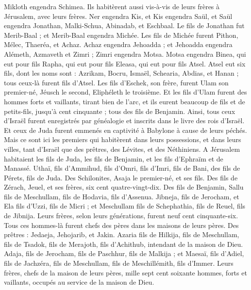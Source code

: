 \begin{multicols}{2}
Mikloth engendra Schimea. Ils habitèrent aussi vis-à-vis de leurs frères à Jérusalem, avec leurs frères.
Ner engendra Kis, et Kis engendra Saül, et Saül engendra Jonathan, Malki-Schua, Abinadab, et Eschbaal.
Le fils de Jonathan fut Merib-Baal ; et Merib-Baal engendra Michée.
Les fils de Michée furent Pithon, Mélec, Thaeréa, et Achaz.
Achaz engendra Jehoadda ; et Jehoadda engendra Alémeth, Azmaveth et Zimri ; Zimri engendra Motsa.
Motsa engendra Binea, qui eut pour fils Rapha, qui eut pour fils Eleasa, qui eut pour fils Atsel.
Atsel eut six fils, dont les noms sont : Azrikam, Bocru, Ismaël, Schearia, Abdias, et Hanan ; tous ceux-là furent fils d'Atsel.
Les fils d'Eschek, son frère, furent Ulam son premier-né, Jéusch le second, Eliphéleth le troisième.
Et les fils d'Ulam furent des hommes forts et vaillants, tirant bien de l'arc, et ils eurent beaucoup de fils et de petits-fils, jusqu'à cent cinquante ; tous des fils de Benjamin.
\VerseOne{}Ainsi, tous ceux d'Israël furent enregistrés par généalogie et inscrits dans le livre des rois d'Israël. Et ceux de Juda furent emmenés en captivité à Babylone à cause de leurs péchés.
Mais ce sont ici les premiers qui habitèrent dans leurs possessions, et dans leurs villes, tant d'Israël que des prêtres, des Lévites, et des Néthiniens.
A Jérusalem habitaient les fils de Juda, les fils de Benjamin, et les fils d'Ephraïm et de Manassé.
Uthaï, fils d'Ammihud, fils d'Omri, fils d'Imri, fils de Bani, des fils de Pérets, fils de Juda.
Des Schilonites, Asaja le premier-né, et ses fils.
Des fils de Zérach, Jeuel, et ses frères, six cent quatre-vingt-dix.
Des fils de Benjamin, Sallu fils de Meschullam, fils de Hodavia, fils d'Assenua.
Jibneja, fils de Jerocham, et Ela fils d'Uzzi, fils de Micri ; et Meschullam fils de Schephathia, fils de Reuel, fils de Jibnija.
Leurs frères, selon leurs générations, furent neuf cent cinquante-six. Tous ces hommes-là furent chefs des pères dans les maisons de leurs pères.
Des prêtres : Jedaeja, Jehojarib, et Jakin.
Azaria fils de Hilkija, fils de Meschullam, fils de Tsadok, fils de Merajoth, fils d'Achithub, intendant de la maison de Dieu.
Adaja, fils de Jerocham, fils de Paschhur, fils de Malkija ; et Maesaï, fils d'Adiel, fils de Jachzéra, fils de Meschullam, fils de Meschillémith, fils d'Immer.
Leurs frères, chefs de la maison de leurs pères, mille sept cent soixante hommes, forts et vaillants, occupés au service de la maison de Dieu.

\end{multicols}
